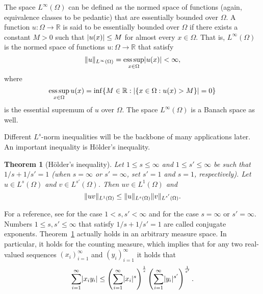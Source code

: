 \documentclass[english, 12pt, a4paper, sci, utf8, a-2b, online]{aaltothesis}
\theoremstyle{definition}
\theoremstyle{plain}
\newtheorem{theorem}{Theorem}[section]
\DeclarePairedDelimiter\abs{\lvert}{\rvert}
\DeclarePairedDelimiter\norm{\lVert}{\rVert}
\DeclareMathOperator*{\esssup}{ess\,sup}
\numberwithin{equation}{section}
\begin{document}
The space $L^{\infty}(\Omega)$ can be defined as the normed space of functions
(again, equivalence classes to be pedantic) that are essentially bounded
over $\Omega$. A function $u: \Omega \to \mathbb{R}$ is said to be
essentially bounded over $\Omega$
if there exists a constant $M > 0$ such that $\abs{u(x)} \leq M$
for almost every $x \in \Omega$. That is, $L^{\infty}(\Omega)$
is the normed space of functions $u: \Omega \to \mathbb{R}$ that satisfy
\begin{equation*}
    \norm{u}_{L^{\infty}(\Omega)}
    = \esssup_{x \in \Omega} \abs{u(x)}
    < \infty,
\end{equation*}
where
\begin{equation*}
    \esssup_{x \in \Omega} u(x)
    = \inf \{ M \in \mathbb{R} : \abs{\{ x \in \Omega : u(x) > M \}} = 0 \}
\end{equation*}
is the essential supremum of $u$ over $\Omega$.
The space $L^{\infty}(\Omega)$ is a Banach space as well.

Different $L^s$-norm inequalities will be the backbone of many applications
later. An important inequality is Hölder's inequality.
\begin{theorem}[Hölder's inequality]
    \label{thm:höldersineq}
    Let $1 \leq s \leq \infty$ and $1 \leq s' \leq \infty$ be
    such that $1/s + 1/s' = 1$
    (when $s=\infty$ or $s'=\infty$, set $s'=1$ and $s=1$, respectively).
    Let $u \in L^s(\Omega)$ and $v \in L^{s'}(\Omega)$. Then $uv \in L^1(\Omega)$ and
    \begin{equation*}
        \norm{uv}_{L^1(\Omega)} \leq \norm{u}_{L^s(\Omega)}
            \norm{v}_{\vphantom{L^s(\Omega)} \smash{L^{s'}(\Omega)}}.
    \end{equation*}
\end{theorem}
For a reference, see \cite[Theorem~6.2 on p.~182]{folland1999} for the case $1<s,s'<\infty$
and \cite[Theorem~6.8 on p.~184]{folland1999} for the case $s=\infty$ or $s'=\infty$.
Numbers $1 \leq s,s' \leq \infty$ that satisfy $1/s + 1/s' = 1$
are called conjugate exponents. Theorem~\ref{thm:höldersineq} actually
holds in an arbitrary measure space. In particular, it holds for the
counting measure, which implies that for any two real-valued sequences $(x_i)_{i=1}^{\infty}$
and $(y_i)_{i=1}^{\infty}$ it holds that
\begin{equation*}
    \sum_{i=1}^{\infty} \abs{x_i y_i}
    \leq \left( \sum_{i=1}^{\infty} \abs{x_i}^s \right)^{\frac{1}{s}}
        \left( \sum_{i=1}^{\infty} \abs{y_i}^{s'} \right)^{\frac{1}{s'}}.
\end{equation*}
\end{document}
